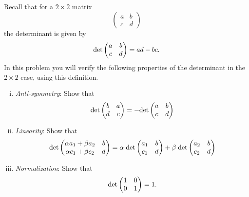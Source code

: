 \begin{question}	\normalfont
	Recall that for a $2\times 2$ matrix 
	\[
	\begin{pmatrix}
			a & b \\
			c & d
		\end{pmatrix}
\]
the determinant is given by
\[
\textup{det} \begin{pmatrix}
			a & b \\
			c & d
		\end{pmatrix} = ad - bc. 
\]
In this problem you will verify the following properties of the determinant in the $2\times 2$ case, using this definition. 

\begin{enumerate}[(i)]

\item \emph{Anti-symmetry}: Show that 
\[
\textup{det}\begin{pmatrix}
			b & a \\
			d & c
		\end{pmatrix} = - \textup{det}\begin{pmatrix}
			a & b \\
			c & d
		\end{pmatrix} 
\]
\item \emph{Linearity}: Show that 
\[
\textup{det}\begin{pmatrix}
			\alpha a_1 + \beta a_2 & b \\
			\alpha c_1 + \beta c_2 & d
		\end{pmatrix} = \alpha \hspace{.1cm} \textup{det}\begin{pmatrix}
			a_1 & b \\
			c_1 & d
		\end{pmatrix} + \beta  \hspace{.1cm}  \textup{det}\begin{pmatrix}
			a_2 & b \\
			c_2 & d
		\end{pmatrix}  
\]

\item \emph{Normalization}: Show that 
\[
\textup{det}\begin{pmatrix}
			1 & 0 \\
			0 & 1
		\end{pmatrix} = 1.
\]

\end{enumerate}

\end{question}